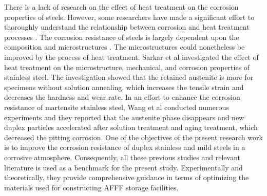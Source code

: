 There is a lack of research on the effect of heat treatment on the corrosion properties of steels. However, some researchers have made a significant effort to thoroughly understand the relationship between corrosion and heat treatment processes \cite{whitman1924effect, hackerman1987theory}. The corrosion resistance of steels is largely dependent upon the composition and microstructures \cite{wang2020enhancing}. The microstructures could nonetheless be improved by the process of heat treatment. Sarkar et al \cite{sarkar2020effects} investigated the effect of heat treatment on the microstructure, mechanical, and corrosion properties of stainless steel. The investigation showed that the retained austenite is more for specimens without solution annealing, which increases the tensile strain and decreases the hardness and wear rate. In an effort to enhance the corrosion resistance of martensite stainless steel, Wang et al \cite{wang2020enhancing} conducted numerous experiments and they reported that the austenite phase disappears and new duplex particles accelerated after solution treatment and aging treatment, which decreased the pitting corrosion. 
One of the objectives of the present research work is to improve the corrosion resistance of duplex stainless and mild steels in a corrosive atmosphere. Consequently, all these previous studies and relevant literature is used as a benchmark for the present study. Experimentally and theoretically, they provide comprehensive guidance in terms of optimizing the materials used for constructing AFFF storage facilities.

